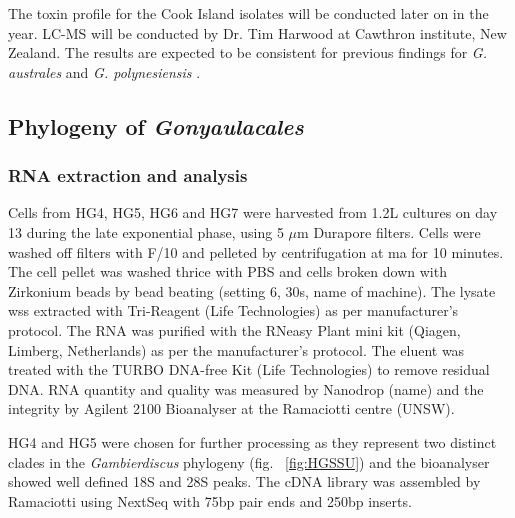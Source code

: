\documentclass[12pt]{article}
\begin{document}
The toxin profile for the Cook Island isolates will be conducted later on in the year. LC-MS will be conducted by Dr. Tim Harwood at Cawthron institute, New Zealand. The results are expected to be consistent for previous findings for \emph{G. australes} and \emph{G. polynesiensis} \cite{chinain2010growth,rhodes2014production}.
 

\subsection{Phylogeny of \emph{Gonyaulacales}}

\subsubsection{RNA extraction and analysis}
Cells from HG4, HG5, HG6 and HG7 were harvested from 1.2L cultures on day 13 during the late exponential phase, using 5 $\mu$m Durapore filters. Cells were washed off filters with F/10 and pelleted by centrifugation at ma for 10 minutes. The cell pellet was washed thrice with PBS and cells broken down with Zirkonium beads by bead beating (setting 6, 30s, name of machine). The lysate wss extracted with Tri-Reagent (Life Technologies) as per manufacturer's protocol. The RNA was purified with the RNeasy Plant mini kit (Qiagen, Limberg, Netherlands) as per the manufacturer's protocol. The eluent was treated with the TURBO DNA-free Kit (Life Technologies) to remove residual DNA. RNA quantity and quality was measured by Nanodrop (name) and the integrity by Agilent 2100 Bioanalyser  at the Ramaciotti centre (UNSW).

HG4 and HG5 were chosen for further processing as they represent two distinct clades in the \emph{Gambierdiscus} phylogeny (fig. ~\ref{fig:HGSSU}) and the bioanalyser showed well defined 18S and 28S peaks. The cDNA library was assembled by Ramaciotti using NextSeq with 75bp pair ends and 250bp inserts.




\end{document}
